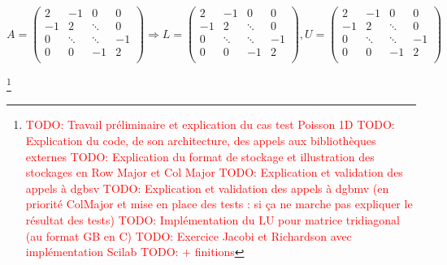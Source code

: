 \documentclass{article}
\begin{document}
\[
	A = 
	\begin{pmatrix}
			2	& 	-1	&	0	& 0	\\
			-1	&	2	&\ddots	& 0	\\
			0	& \ddots&\ddots	&-1	\\
			0	& 	0	& -1 	& 2	\\
	\end{pmatrix}
	\Longrightarrow
	L = 
	\begin{pmatrix}
			2	& 	-1	&	0	& 0	\\
			-1	&	2	&\ddots	& 0	\\
			0	& \ddots&\ddots	&-1	\\
			0	& 	0	& -1 	& 2	\\
	\end{pmatrix},
	U = 
	\begin{pmatrix}
			2	& 	-1	&	0	& 0	\\
			-1	&	2	&\ddots	& 0	\\
			0	& \ddots&\ddots	&-1	\\
			0	& 	0	& -1 	& 2	\\
	\end{pmatrix}
\]

\footnote{\textcolor{red}{TODO: Travail préliminaire et explication du cas test Poisson 1D}\newline
\textcolor{red}{TODO: Explication du code, de son architecture, des appels aux bibliothèques externes}\newline
\textcolor{red}{TODO: Explication du format de stockage et illustration des stockages en Row Major et Col Major}\newline
\textcolor{red}{TODO: Explication et validation des appels à dgbsv}\newline
\textcolor{red}{TODO: Explication et validation des appels à dgbmv (en priorité ColMajor et mise en place des tests : si ça ne marche pas expliquer le résultat des tests)}\newline
\textcolor{red}{TODO: Implémentation du LU pour matrice tridiagonal (au format GB en C)}\newline
\textcolor{red}{TODO: Exercice Jacobi et Richardson avec implémentation Scilab}\newline
\textcolor{red}{TODO: + finitions}}
\end{document}

